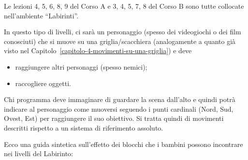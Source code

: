 \ruoliattivita{\ruoloProgrammatore}

Le lezioni 4, 5, 6, 8, 9 del Corso A e 3, 4, 5, 7, 8 del Corso B sono tutte collocate nell'ambiente ``Labirinti''.

In questo tipo di livelli, ci sarà un personaggio (spesso dei videogiochi o dei film conosciuti) che si muove su una griglia/scacchiera (analogamente a quanto già visto nel Capitolo~\ref{capitolo-4-movimenti-su-una-griglia}) e deve

\begin{itemize}
\item
  raggiungere altri personaggi (spesso nemici);
\item
  raccogliere oggetti.
\end{itemize}

Chi programma deve immaginare di guardare la scena dall'alto e quindi potrà indicare al personaggio come muoversi seguendo i punti cardinali (Nord, Sud, Ovest, Est) per raggiungere il suo obiettivo. Si tratta quindi di movimenti descritti rispetto a un sistema di riferimento assoluto.

Ecco una guida sintetica sull'effetto dei blocchi che i bambini possono incontrare nei livelli del Labirinto:

